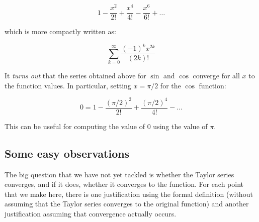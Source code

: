 \documentclass{amsart}
\begin{document}
$$1 - \frac{x^2}{2!} + \frac{x^4}{4!} - \frac{x^6}{6!} + \dots$$

which is more compactly written as:

$$\sum_{k=0}^\infty \frac{(-1)^kx^{2k}}{(2k)!}$$

It {\em turns out} that the series obtained above for $\sin$ and $\cos$
converge for all $x$ to the function values. In particular, setting $x
= \pi/2$ for the $\cos$ function:

$$0 = 1 - \frac{(\pi/2)^2}{2!} + \frac{(\pi/2)^4}{4!} - \dots$$

This can be useful for computing the value of $0$ using the value of
$\pi$.

\subsection{Some easy observations}

The big question that we have not yet tackled is whether the Taylor
series converges, and if it does, whether it converges to the
function. For each point that we make here, there is one justification
using the formal definition (without assuming that the Taylor series
converges to the original function) and another justification assuming
that convergence actually occurs.
\end{document}
